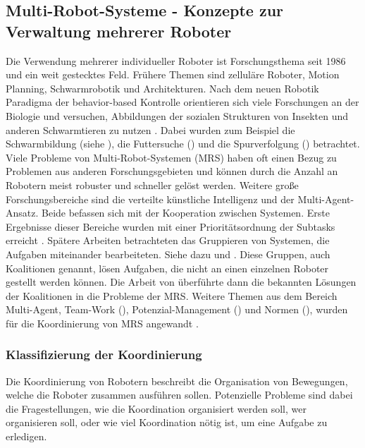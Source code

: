 \subsection{Multi-Robot-Systeme - Konzepte zur Verwaltung mehrerer Roboter}
\label{sec:relatedwork-multirobots}
    
Die Verwendung mehrerer individueller Roboter ist Forschungsthema seit 1986 und ein weit gestecktes Feld. Frühere Themen sind zelluläre Roboter, Motion Planning, Schwarmrobotik und Architekturen. Nach dem neuen Robotik Paradigma der behavior-based Kontrolle orientieren sich viele Forschungen an der Biologie und versuchen, Abbildungen der sozialen Strukturen von Insekten und anderen Schwarmtieren zu nutzen \citep{parker2003current}. Dabei wurden zum Beispiel die Schwarmbildung (siehe \cite{hayes2002self}), die Futtersuche (\cite{balch1999impact}) und die Spurverfolgung (\cite{vaughan2000whistling}) betrachtet. Viele Probleme von Multi-Robot-Systemen (MRS) haben oft einen Bezug zu Problemen aus anderen Forschungsgebieten und können durch die Anzahl an Robotern meist robuster und schneller gelöst werden. Weitere große Forschungsbereiche sind die verteilte künstliche Intelligenz und der Multi-Agent-Ansatz. Beide befassen sich mit der Kooperation zwischen Systemen. Erste Ergebnisse dieser Bereiche wurden mit einer Prioritätsordnung der Subtasks erreicht \citep{durfee1987coherent}. Spätere Arbeiten betrachteten das Gruppieren von Systemen, die Aufgaben miteinander bearbeiteten. Siehe dazu \cite{shehory1998methods} und \cite{lau2003task}. Diese Gruppen, auch Koalitionen genannt, lösen Aufgaben, die nicht an einen einzelnen Roboter gestellt werden können. Die Arbeit von \cite{vig2005issues} überführte dann die bekannten Lösungen der Koalitionen in die Probleme der MRS. Weitere Themen aus dem Bereich Multi-Agent, Team-Work (\cite{pynadath2003automated}), Potenzial-Management (\cite{timm2003ontology}) und Normen (\cite{boella2002norms}), wurden für die Koordinierung von MRS angewandt \citep{lundh2006plan}.

\subsubsection{Klassifizierung der Koordinierung}
Die Koordinierung von Robotern beschreibt die Organisation von Bewegungen, welche die Roboter zusammen ausführen sollen. Potenzielle Probleme sind dabei die Fragestellungen, wie die Koordination organisiert werden soll, wer organisieren soll, oder wie viel Koordination nötig ist, um eine Aufgabe zu erledigen.

